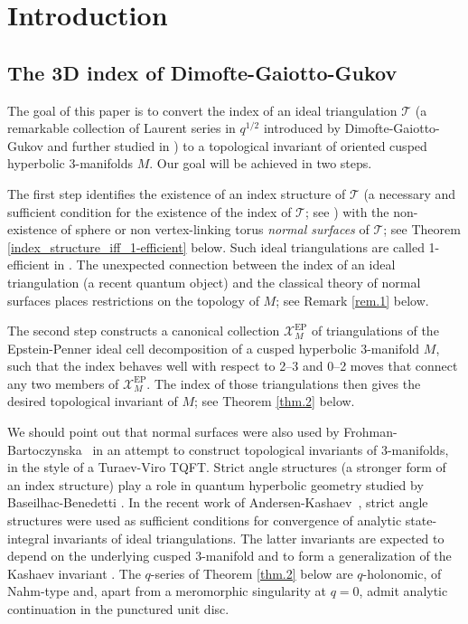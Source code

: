\documentclass[12pt]{amsart}
\theoremstyle{definition}
\theoremstyle{remark}
\def\calX{\mathcal X}
\newcommand{\CT}{\mathcal{T}}
\def\EP{\mathrm{EP}}
\begin{document}
\maketitle

\tableofcontents


\section{Introduction}
\label{sec.intro}


\subsection{The 3D index of Dimofte-Gaiotto-Gukov}
\label{sub.DGG}

The goal of this paper is to convert the index of an ideal triangulation
$\CT$ (a remarkable collection of Laurent series in $q^{1/2}$ introduced by 
Dimofte-Gaiotto-Gukov \cite{DGG1,DGG2} and further studied in \cite{Ga:index})
to a topological invariant of oriented cusped hyperbolic 3-manifolds $M$. 
Our goal will be achieved in two steps. 

The first step identifies the 
existence of an index 
structure of $\CT$ (a necessary and sufficient condition for the existence
of the index of $\CT$; see \cite{Ga:index}) with the non-existence
of sphere or non vertex-linking torus {\em normal surfaces} of $\CT$; see Theorem
\ref{index_structure_iff_1-efficient} below. Such ideal triangulations are called 1-efficient in 
\cite{JR,KR2}. 
The unexpected connection between the 
index of an ideal triangulation (a recent quantum object) and the 
classical theory of normal surfaces places restrictions
on the topology of $M$; see Remark \ref{rem.1} below. 

The second step
constructs a canonical collection $\calX_M^{\EP}$ of triangulations
of the Epstein-Penner ideal cell decomposition of a cusped hyperbolic 
3-manifold $M$, such that the index behaves well with respect to 2--3 and 0--2 moves that connect any two members of $\calX_M^{\EP}$. The index
of those triangulations then gives the desired topological invariant of $M$;
see Theorem \ref{thm.2} below.

We should point out that normal surfaces were
also used by Frohman-Bartoczynska~\cite{FK} in an attempt to construct 
topological invariants of
3-manifolds, in the style of a Turaev-Viro TQFT. Strict angle structures 
(a stronger form of an index structure) play a role in quantum hyperbolic 
geometry studied by Baseilhac-Benedetti \cite{BB1,BB2}. In the recent work 
of Andersen-Kashaev~\cite{AK}, strict angle structures
were used as sufficient conditions for convergence of analytic state-integral 
invariants of ideal triangulations. The latter invariants are 
expected to depend on the underlying cusped 3-manifold and to form
a generalization of the Kashaev invariant 
\cite{Ka}. The $q$-series of Theorem \ref{thm.2} below are $q$-holonomic,
of Nahm-type and, apart from a meromorphic singularity at $q=0$, admit analytic
continuation in the punctured unit disc. 
\end{document}
